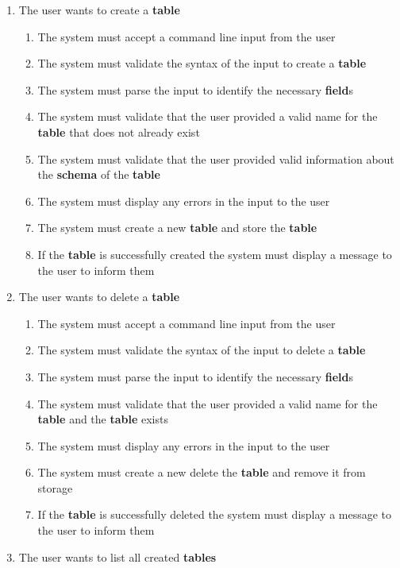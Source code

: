 \documentclass[12pt, titlepage]{article}
\begin{document}
\begin{enumerate}[{BE}1.]
    \item The user wants to create a \textbf{table}
    \begin{enumerate}[{FR}1.]
        \item The system must accept a command line input from the user
        \item The system must validate the syntax of the input to create a \textbf{table}
        \item The system must parse the input to identify the necessary \textbf{field}s
        \item The system must validate that the user provided a valid name for the \textbf{table} that does not already exist
        \item The system must validate that the user provided valid information about the \textbf{schema} of the \textbf{table}
        \item The system must display any errors in the input to the user
        \item The system must create a new \textbf{table} and store the \textbf{table}
        \item If the \textbf{table} is successfully created the system must display a message to the user to inform them
    \end{enumerate}
    \item The user wants to delete a \textbf{table}
    \begin{enumerate}[{FR}1.]
        \item The system must accept a command line input from the user
        \item The system must validate the syntax of the input to delete a \textbf{table}
        \item The system must parse the input to identify the necessary \textbf{field}s
        \item The system must validate that the user provided a valid name for the \textbf{table} and the \textbf{table} exists
        \item The system must display any errors in the input to the user
        \item The system must create a new delete the \textbf{table} and remove it from storage
        \item If the \textbf{table} is successfully deleted the system must display a message to the user to inform them
    \end{enumerate}
    \item The user wants to list all created \textbf{tables}

\end{enumerate}
\end{document}
